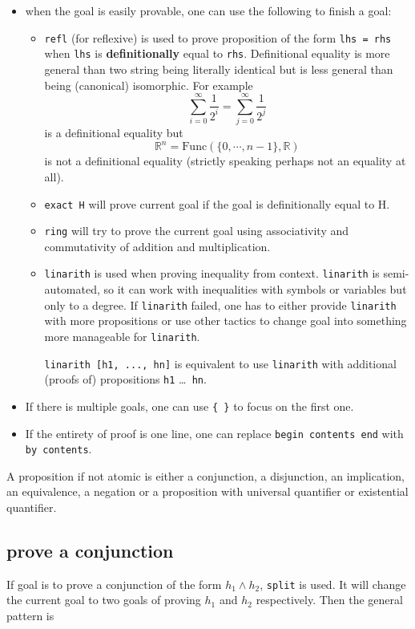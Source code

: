 \documentclass{report}
\theoremstyle{definition}
\theoremstyle{plain}
\begin{document}
\begin{itemize}
  \item when the goal is easily provable, one can use the following to finish a goal:
  \begin{itemize}
    \item {\tt refl} (for reflexive) is used to prove proposition of the form {\tt lhs = rhs} when {\tt lhs} is {\bf definitionally} equal to {\tt rhs}. Definitional equality is more general than two string being literally identical but is less general than being (canonical) isomorphic. For example
    $$
  \sum_{i=0}^\infty \frac{1}{2^i}=\sum_{j=0}^\infty \frac{1}{2^j}
    $$
    is a definitional equality but
    $$
  \mathbb R^n = \mathrm{Func}\left(\{0,\cdots, n-1\},\mathbb R\right)
    $$ is not a definitional equality (strictly speaking perhaps not an equality at all).
    \item {\tt exact H} will prove current goal if the goal is definitionally equal to H. 
  
    \item {\tt ring} will try to prove the current goal using associativity and commutativity of addition and multiplication.
    \item {\tt linarith} is used when proving inequality from context. {\tt linarith} is semi-automated, so it can work with inequalities with symbols or variables but only to a degree. If {\tt linarith} failed, one has to either provide {\tt linarith} with more propositions or use other tactics to change goal into something more manageable for {\tt linarith}.
  
    {\tt linarith [h1, ..., hn]} is equivalent to use {\tt linarith} with additional (proofs of) propositions {\tt h1} \dots {\tt { hn}}.
  \end{itemize}

  \item If there is multiple goals, one can use {\tt \{ \}} to focus on the first one.
  \item If the entirety of proof is one line, one can replace {\tt begin contents end} with {\tt by contents}.
\end{itemize}


A proposition if not atomic is either a conjunction, a disjunction, an implication, an equivalence, a negation or a proposition with universal quantifier or existential quantifier.

\subsection*{prove a conjunction}\label{lean:conj}
If goal is to prove a conjunction of the form $h_1 \land h_2$, {\tt split} is used. It will change the current goal to two goals of proving $h_1$ and $h_2$ respectively. Then the general pattern is
\end{document}
